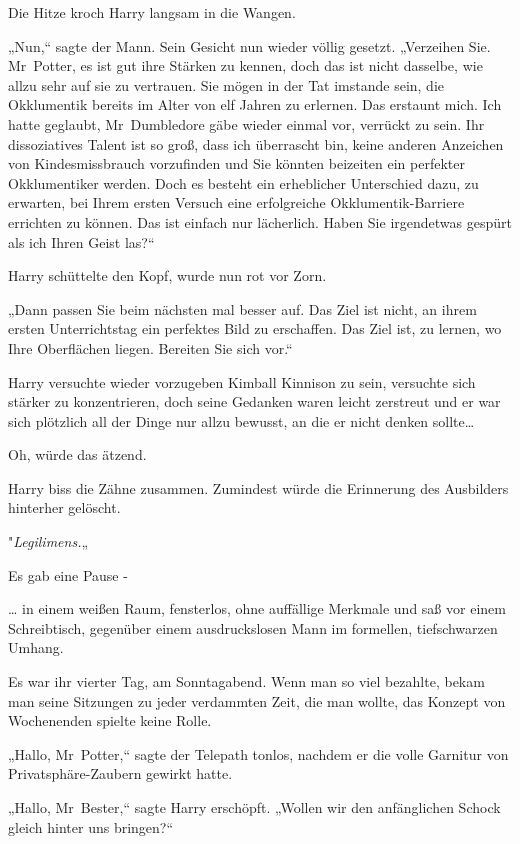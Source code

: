 {Die Hitze kroch Harry langsam in die Wangen.

„Nun,“ sagte der Mann. Sein Gesicht nun wieder völlig gesetzt. „Verzeihen Sie. Mr~Potter, es ist gut ihre Stärken zu kennen, doch das ist nicht dasselbe, wie allzu sehr auf sie zu vertrauen. Sie mögen in der Tat imstande sein, die Okklumentik bereits im Alter von elf Jahren zu erlernen. Das erstaunt mich. Ich hatte geglaubt, Mr~Dumbledore gäbe wieder einmal vor, verrückt zu sein. Ihr dissoziatives Talent ist so groß, dass ich überrascht bin, keine anderen Anzeichen von Kindesmissbrauch vorzufinden und Sie könnten beizeiten ein perfekter Okklumentiker werden. Doch es besteht ein erheblicher Unterschied dazu, zu erwarten, bei Ihrem ersten Versuch eine erfolgreiche Okklumentik-Barriere errichten zu können. Das ist einfach nur lächerlich. Haben Sie irgendetwas gespürt als ich Ihren Geist las?“

Harry schüttelte den Kopf, wurde nun rot vor Zorn.

„Dann passen Sie beim nächsten mal besser auf. Das Ziel ist nicht, an ihrem ersten Unterrichtstag ein perfektes Bild zu erschaffen. Das Ziel ist, zu lernen, wo Ihre Oberflächen liegen. Bereiten Sie sich vor.“

Harry versuchte wieder vorzugeben Kimball Kinnison zu sein, versuchte sich stärker zu konzentrieren, doch seine Gedanken waren leicht zerstreut und er war sich plötzlich all der Dinge nur allzu bewusst, an die er nicht denken sollte…

Oh, würde das ätzend.

Harry biss die Zähne zusammen. Zumindest würde die Erinnerung des Ausbilders hinterher gelöscht.

"\emph{Legilimens.}„

Es gab eine Pause -

\later

… in einem weißen Raum, fensterlos, ohne auffällige Merkmale und saß vor einem Schreibtisch, gegenüber einem ausdruckslosen Mann im formellen, tiefschwarzen Umhang.

Es war ihr vierter Tag, am Sonntagabend. Wenn man so viel bezahlte, bekam man seine Sitzungen zu jeder verdammten Zeit, die man wollte, das Konzept von Wochenenden spielte keine Rolle.

„Hallo, Mr~Potter,“ sagte der Telepath tonlos, nachdem er die volle Garnitur von Privatsphäre-Zaubern gewirkt hatte.

„Hallo, Mr~Bester,“ sagte Harry erschöpft. „Wollen wir den anfänglichen Schock gleich hinter uns bringen?“

}
